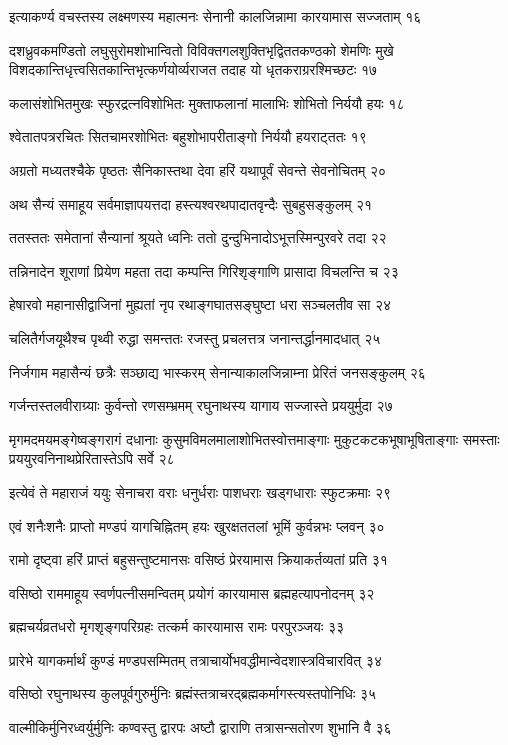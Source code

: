 इत्याकर्ण्य वचस्तस्य लक्ष्मणस्य महात्मनः
सेनानी कालजिन्नामा कारयामास सज्जताम् १६

दशध्रुवकमण्डितो लघुसुरोमशोभान्वितो विविक्तगलशुक्तिभृद्विततकण्ठको शेमणिः मुखे
विशदकान्तिधृत्त्वसितकान्तिभृत्कर्णयोर्व्यराजत तदाह यो धृतकराग्ररश्मिच्छटः १७

कलासंशोभितमुखः स्फुरद्रत्नविशोभितः
मुक्ताफलानां मालाभिः शोभितो निर्ययौ हयः १८

श्वेतातपत्ररचितः सितचामरशोभितः
बहुशोभापरीताङ्गो निर्ययौ हयराट्ततः १९

अग्रतो मध्यतश्चैके पृष्ठतः सैनिकास्तथा
देवा हरिं यथापूर्वं सेवन्ते सेवनोचितम् २०

अथ सैन्यं समाहूय सर्वमाज्ञापयत्तदा
हस्त्यश्वरथपादातवृन्दैः सुबहुसङ्कुलम् २१

ततस्ततः समेतानां सैन्यानां श्रूयते ध्वनिः
ततो दुन्दुभिनादोऽभूत्तस्मिन्पुरवरे तदा २२

तन्निनादेन शूराणां प्रियेण महता तदा
कम्पन्ति गिरिशृङ्गाणि प्रासादा विचलन्ति च २३

हेषारवो महानासीद्वाजिनां मुह्यतां नृप
रथाङ्गघातसङ्घुष्टा धरा सञ्चलतीव सा २४

चलितैर्गजयूथैश्च पृथ्वी रुद्धा समन्ततः
रजस्तु प्रचलत्तत्र जनान्तर्द्धानमादधात् २५

निर्जगाम महासैन्यं छत्रैः सञ्छाद्य भास्करम्
सेनान्याकालजिन्नाम्ना प्रेरितं जनसङ्कुलम् २६

गर्जन्तस्तलवीराग्र्याः कुर्वन्तो रणसम्भ्रमम्
रघुनाथस्य यागाय सज्जास्ते प्रययुर्मुदा २७

मृगमदमयमङ्गेष्वङ्गरागं दधानाः कुसुमविमलमालाशोभितस्वोत्तमाङ्गाः
मुकुटकटकभूषाभूषिताङ्गाः समस्ताः प्रययुरवनिनाथप्रेरितास्तेऽपि सर्वे २८

इत्येवं ते महाराजं ययुः सेनाचरा वराः
धनुर्धराः पाशधराः खड्गधाराः स्फुटक्रमाः २९

एवं शनैःशनैः प्राप्तो मण्डपं यागचिह्नितम्
हयः खुरक्षततलां भूमिं कुर्वन्नभः प्लवन् ३०

रामो दृष्ट्वा हरिं प्राप्तं बहुसन्तुष्टमानसः
वसिष्ठं प्रेरयामास क्रियाकर्तव्यतां प्रति ३१

वसिष्ठो राममाहूय स्वर्णपत्नीसमन्वितम्
प्रयोगं कारयामास ब्रह्महत्यापनोदनम् ३२

ब्रह्मचर्यव्रतधरो मृगशृङ्गपरिग्रहः
तत्कर्म कारयामास रामः परपुरञ्जयः ३३

प्रारेभे यागकर्मार्थं कुण्डं मण्डपसम्मितम्
तत्राचार्योभवद्धीमान्वेदशास्त्रविचारवित् ३४

वसिष्ठो रघुनाथस्य कुलपूर्वगुरुर्मुनिः
ब्रह्मंस्तत्राचरद्ब्रह्मकर्मागस्त्यस्तपोनिधिः ३५

वाल्मीकिर्मुनिरध्वर्युर्मुनिः कण्वस्तु द्वारपः
अष्टौ द्वाराणि तत्रासन्सतोरण शुभानि वै ३६

